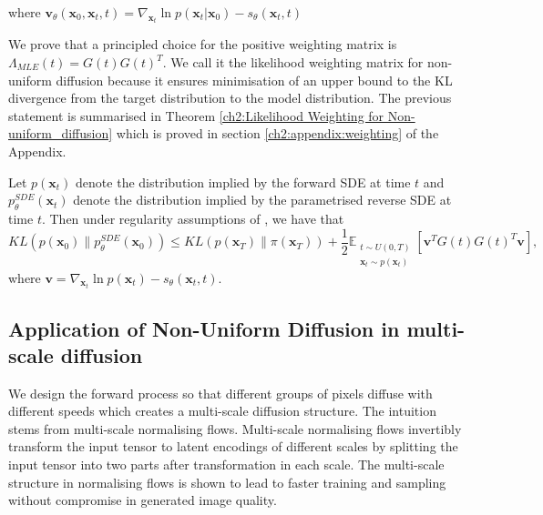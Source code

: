 \noindent where \(\textbf{v}_{\theta}(\textbf{x}_0,\textbf{x}_t,t)=\nabla_{\textbf{x}_t}{\ln{p(\textbf{x}_t | \textbf{x}_0)}} - s_\theta(\textbf{x}_t,t)\)

We prove that a principled choice for the positive weighting matrix is $\Lambda_{MLE}(t)=G(t)G(t)^T$. We call it the likelihood weighting matrix for non-uniform diffusion because it ensures minimisation of an upper bound to the KL divergence from the target distribution to the model distribution. The previous statement is summarised in Theorem \ref{ch2:Likelihood Weighting for Non-uniform_diffusion} which is proved in section \ref{ch2:appendix:weighting} of the Appendix.

\begin{theorem}\label{ch2:Likelihood Weighting for Non-uniform_diffusion}
    Let $p(\mathbf{x}_t)$ denote the distribution implied by the forward SDE at time $t$ and $p^{SDE}_\theta(\mathbf{x}_t)$ denote the distribution implied by the parametrised reverse SDE at time $t$. Then under regularity assumptions of \cite[Theorem 1]{song2021maximum}, we have that
    \[
    KL(p(\mathbf{x}_0) \| p^{SDE}_\theta(\mathbf{x}_0)) \leq KL(p(\mathbf{x}_T) \| \pi(\mathbf{x}_T)) + \frac{1}{2} \mathbb{E}_{\substack{t \sim U(0,T) \\ \mathbf{x}_t \sim p(\mathbf{x}_t)}} \left[ \mathbf{v}^T G(t) G(t)^T \mathbf{v} \right],
    \]
    where $\mathbf{v} = \nabla_{\mathbf{x}_t} \ln{p(\mathbf{x}_t)} - s_\theta(\mathbf{x}_t, t)$.
\end{theorem}


\subsection{Application of Non-Uniform Diffusion in multi-scale diffusion} \label{ch2:sec:multi-scale_diffusion}

We design the forward process so that different groups of pixels diffuse with different speeds which creates a multi-scale diffusion structure. The intuition stems from multi-scale normalising flows. Multi-scale normalising flows invertibly transform the input tensor to latent encodings of different scales by splitting the input tensor into two parts after transformation in each scale. The multi-scale structure in normalising flows is shown to lead to faster training and sampling without compromise in generated image quality. %

